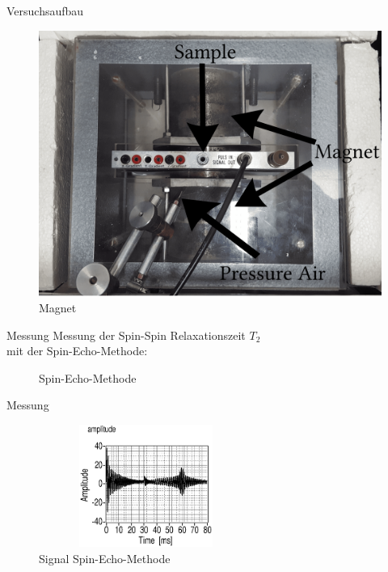 \begin{frame}{Versuchsaufbau}
	\begin{figure}
	\centering
	\includegraphics[scale=.075]{images//magnet.png}
	\caption{Magnet}
	\end{figure}
\end{frame}

\begin{frame}{Messung}
Messung der Spin-Spin Relaxationszeit $T_2$\\mit der Spin-Echo-Methode:
	\begin{figure}
	\centering
	
	\caption{Spin-Echo-Methode}
	\end{figure}
\end{frame}

\begin{frame}{Messung}
	\begin{figure}
	\centering
	\includegraphics[width=7cm, height=4cm]{images//sequenz12.eps}
	\caption{Signal Spin-Echo-Methode}
	\end{figure}
\end{frame}

